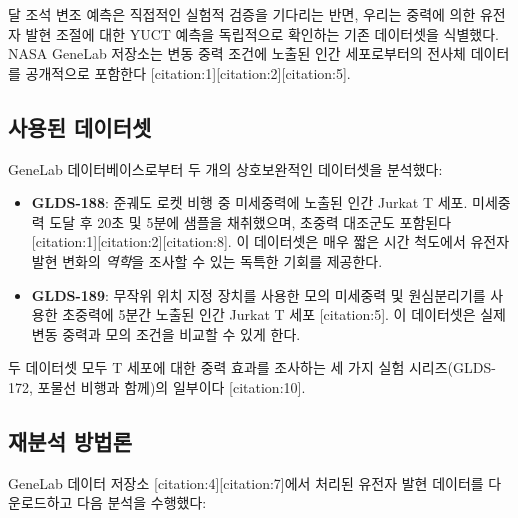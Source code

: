 \documentclass[12pt,a4paper]{article}
\theoremstyle{remark}
\begin{document}
	달 조석 변조 예측은 직접적인 실험적 검증을 기다리는 반면, 우리는 중력에 의한 유전자 발현 조절에 대한 YUCT 예측을 독립적으로 확인하는 기존 데이터셋을 식별했다. NASA GeneLab 저장소는 변동 중력 조건에 노출된 인간 세포로부터의 전사체 데이터를 공개적으로 포함한다 [citation:1][citation:2][citation:5].
	
	\subsection{사용된 데이터셋}
	
	GeneLab 데이터베이스로부터 두 개의 상호보완적인 데이터셋을 분석했다:
	
	\begin{itemize}
		\item \textbf{GLDS-188}: 준궤도 로켓 비행 중 미세중력에 노출된 인간 Jurkat T 세포. 미세중력 도달 후 20초 및 5분에 샘플을 채취했으며, 초중력 대조군도 포함된다 [citation:1][citation:2][citation:8]. 이 데이터셋은 매우 짧은 시간 척도에서 유전자 발현 변화의 \textit{역학}을 조사할 수 있는 독특한 기회를 제공한다.
		
		\item \textbf{GLDS-189}: 무작위 위치 지정 장치를 사용한 모의 미세중력 및 원심분리기를 사용한 초중력에 5분간 노출된 인간 Jurkat T 세포 [citation:5]. 이 데이터셋은 실제 변동 중력과 모의 조건을 비교할 수 있게 한다.
	\end{itemize}
	
	두 데이터셋 모두 T 세포에 대한 중력 효과를 조사하는 세 가지 실험 시리즈(GLDS-172, 포물선 비행과 함께)의 일부이다 [citation:10].
	
	\subsection{재분석 방법론}
	
	GeneLab 데이터 저장소 [citation:4][citation:7]에서 처리된 유전자 발현 데이터를 다운로드하고 다음 분석을 수행했다:
	
\end{document}
